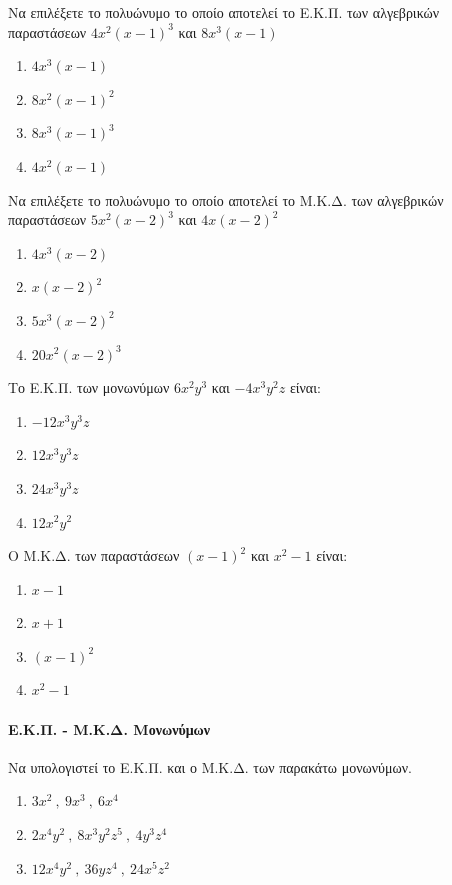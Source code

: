 \documentclass[11pt,a4paper,modern]{FFExercises}
\begin{document}
\askhsh
Να επιλέξετε το πολυώνυμο το οποίο αποτελεί το Ε.Κ.Π. των αλγεβρικών παραστάσεων $ 4x^2(x-1)^3 $ και $ 8x^3(x-1) $
\begin{enumerate}[label=\roman*.]
    \item $ 4x^3(x-1) $
    \item $ 8x^2(x-1)^2 $
    \item $ 8x^3(x-1)^3 $
    \item $ 4x^2(x-1) $
\end{enumerate}

\askhsh
Να επιλέξετε το πολυώνυμο το οποίο αποτελεί το Μ.Κ.Δ. των αλγεβρικών παραστάσεων $ 5x^2(x-2)^3 $ και $ 4x(x-2)^2 $
\begin{enumerate}[label=\roman*.]
    \item $ 4x^3(x-2) $
    \item $ x(x-2)^2 $
    \item $ 5x^3(x-2)^2 $
    \item $ 20x^2(x-2)^3 $
\end{enumerate}

\askhsh
Το Ε.Κ.Π. των μονωνύμων $6x^2y^3$ και $-4x^3y^2z$ είναι:
\begin{enumerate}[label=\roman*.]
    \item $ -12x^3y^3z $
    \item $ 12x^3y^3z $
    \item $ 24x^3y^3z $
    \item $ 12x^2y^2 $
\end{enumerate}

\askhsh
Ο Μ.Κ.Δ. των παραστάσεων $(x-1)^2$ και $x^2-1$ είναι:
\begin{enumerate}[label=\roman*.]
    \item $ x-1 $
    \item $ x+1 $
    \item $ (x-1)^2 $
    \item $ x^2-1 $
\end{enumerate}

\paragraph{Ε.Κ.Π. - Μ.Κ.Δ. Μονωνύμων}


\askhsh
Να υπολογιστεί το Ε.Κ.Π. και ο Μ.Κ.Δ. των παρακάτω μονωνύμων.
\begin{enumerate}[label=\roman*.]
    \item $ 3x^2\ ,\ 9x^3\ ,\ 6x^4 $
    \item $ 2x^4y^2\ ,\ 8x^3y^2z^5\ ,\ 4y^3z^4 $
    \item $ 12x^4y^2\ ,\ 36yz^4\ ,\ 24x^5z^2 $
\end{enumerate}
\end{document}
